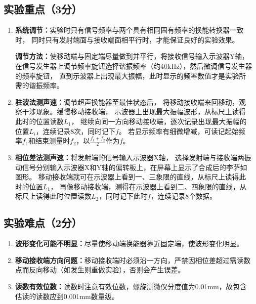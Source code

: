 \documentclass{../template/Preport}
\begin{document}
\subsection{实验重点（3分）}
\begin{enumerate}
    \item \textbf{系统调节：}实验时只有信号频率与两个具有相同固有频率的换能转换器一致时，
    同时只有发射端面与接收端面相平行时，才能保证良好的实验效果。

    \textbf{调节方法：}使移动端与固定端尽量做到并平行，将接收信号输入示波器Y轴，
    在信号发生器上调节频率旋钮选择谐振频率（约40\si{\kilo\hertz}），然后微调信号发生器的频率旋钮，
    直到示波器上出现最大振幅，此时显示的频率数值才是实验所需的谐振频率。

    \item \textbf{驻波法测声速：}调节超声换能器至最佳状态后，
    将移动接收端来回移动，观察干涉现象。缓慢移动接收端，
    示波器上出现最大振幅波形，从标尺上读得此时的位置读数$L_1$，
    继续向同一方向移动接收端，逐次记录出现最大振幅的位置$L_i$，连续记录8次，同时记下$f$。
    若显示频率有细微增减，可读记起始频率$f_1$和结束测量时$f_2$，以$\frac{f_1+f_2}{2}$作为$f$。

    \item \textbf{相位差法测声速：}将发射端的信号输入示波器X轴，
    选择发射端与接收端两振动信号分别输入示波器X和Y轴的偏转板上，在屏幕上显示了合成后的李萨如图形。
    移动接收端就可在示波器上看到一、三象限的直线，从标尺上读得此时的位置$L_1$，
    再像移动接收端，测得在示波器上看到二、四象限的直线，从标尺上读得此时位置读数$L_2$，同时记下此时$f$，连续记录8个数据。
\end{enumerate}
\subsection{实验难点（2分）}
\begin{enumerate}
    \item \textbf{波形变化可能不明显：}尽量使移动端换能器靠近固定端，使波形变化明显。
    \item \textbf{移动接收端方向问题：}移动接收端时必须沿一方向，严禁因相位差超过需读数点而反向移动（如发生则重做实验），否则会产生误差。
    \item \textbf{读数有效位数：}读数时注意有效位数，螺旋测微仪分度值为0.01\si{\milli\metre}，故包含估读的读数应到0.001\si{\milli\metre}数量级。
\end{enumerate}

\end{document}
